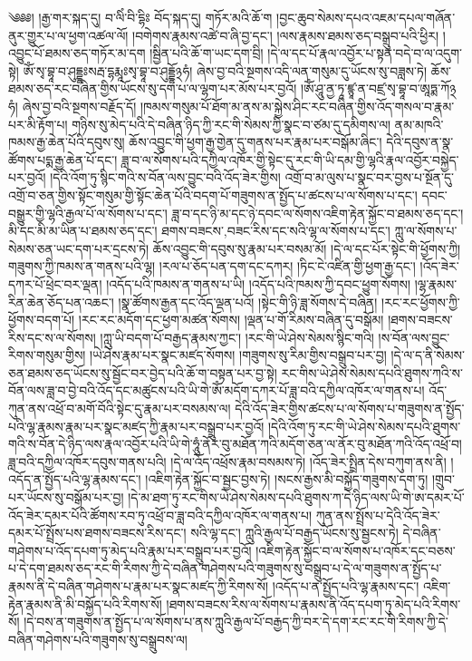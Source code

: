 \setcounter{footnote}{0} 
༄༅༅། །རྒྱ་གར་སྐད་དུ། བ་ལིཾ་བི་དྷིཿ བོད་སྐད་དུ། གཏོར་མའི་ཆོ་ག །བྱང་ཆུབ་སེམས་དཔའ་འཇམ་དཔལ་གཞོན་ནུར་གྱུར་པ་ལ་ཕྱག་འཚལ་ལོ། །བགེགས་རྣམས་འཚེ་བ་ཞི་བྱ་དང་། །ལས་རྣམས་ཐམས་ཅད་བསྒྲུབ་པའི་ཕྱིར། །འབྱུང་པོ་ཐམས་ཅད་གཏོར་མ་དག །སྦྱིན་པའི་ཆོ་ག་ཡང་དག་བྲི། །དེ་ལ་དང་པོ་རྣལ་འབྱོར་པ་སྟན་བདེ་བ་ལ་འདུག་སྟེ། ཨོཾ་སྭ་བྷཱ་བ་ཤུདྡྷཿསརྦ་དྷརྨཱཿསྭ་བྷཱ་བ་ཤུདྡྷོ྅ཧཾ། ཞེས་བྱ་བའི་སྔགས་འདི་ལན་གསུམ་དུ་ཡོངས་སུ་བཟླས་ཏེ། ཆོས་ཐམས་ཅད་རང་བཞིན་གྱིས་ཡོངས་སུ་དག་པ་ལ་ལྷག་པར་མོས་པར་བྱའོ། །ཨོཾ་ཤཱུ་ནྱ་ཏཱ་ཛྙཱ་ན་བཛྲ་སྭ་བྷཱ་བ་ཨཱཏྨ་ཀོ྅ཧཾ། ཞེས་བྱ་བའི་སྔགས་བརྗོད་དོ། །ཁམས་གསུམ་པོ་ཐོག་མ་ནས་མ་སྐྱེས་ཤིང་རང་བཞིན་གྱིས་འོད་གསལ་བ་རྣམ་པར་མི་རྟོག་པ། གཉིས་སུ་མེད་པའི་དེ་བཞིན་ཉིད་ཀྱི་རང་གི་སེམས་ཀྱི་སྣང་བ་ཙམ་དུ་དམིགས་ལ། ནམ་མཁའི་ཁམས་རྒྱ་ཆེན་པོའི་དབུས་སུ། ཆོས་འབྱུང་གི་ཕྱག་རྒྱ་གྱེན་དུ་གནས་པར་རྣམ་པར་བསྒོམ་ཞིང་། དེའི་དབུས་ན་སྣ་ཚོགས་པདྨ་རྒྱ་ཆེན་པོ་དང་། ཟླ་བ་ལ་སོགས་པའི་དཀྱིལ་འཁོར་གྱི་སྟེང་དུ་རང་གི་ཡི་དམ་གྱི་ལྷའི་རྣལ་འབྱོར་བསྐྱེད་པར་བྱའོ། །དེའི་འོག་ཏུ་སྙིང་གའི་ས་བོན་ལས་བྱུང་བའི་འོད་ཟེར་གྱིས། འགྲོ་བ་མ་ལུས་པ་སྣང་བར་བྱས་པ་སྔོན་དུ་འགྲོ་བ་ཅན་གྱིས་སྟོང་གསུམ་གྱི་སྟོང་ཆེན་པོའི་བདག་པོ་གཟུགས་ན་སྤྱོད་པ་ཚངས་པ་ལ་སོགས་པ་དང་། དབང་བསྒྱུར་གྱི་ལྷའི་རྒྱལ་པོ་ལ་སོགས་པ་དང་། ཟླ་བ་དང་ཉི་མ་དང་ཉེ་དབང་ལ་སོགས་འཇིག་རྟེན་སྐྱོང་བ་ཐམས་ཅད་དང་། མི་དང་མི་མ་ཡིན་པ་ཐམས་ཅད་དང་། ཐགས་{བཟངས་,བཟང་}རིས་དང་སའི་ལྷ་ལ་སོགས་པ་དང་། ཀླུ་ལ་སོགས་པ་སེམས་ཅན་ཡང་དག་པར་དྲངས་ཏེ། ཆོས་འབྱུང་གི་དབུས་སུ་རྣམ་པར་བསམ་མོ། །དེ་ལ་དང་པོར་སྟེང་གི་ཕྱོགས་ཀྱི། གཟུགས་ཀྱི་ཁམས་ན་གནས་པའི་ལྷ། །རལ་པ་ཅོད་པན་དག་དང་དཀར། །ཏིང་ངེ་འཛིན་གྱི་ཕྱག་རྒྱ་དང་། །འོད་ཟེར་དཀར་པོ་ཕྲེང་བར་ལྡན། །འདོད་པའི་ཁམས་ན་གནས་པ་ཡི། །འདོད་པའི་ཁམས་ཀྱི་དབང་ཕྱུག་སོགས། །ལྷ་རྣམས་རིན་ཆེན་ཅོད་པན་འཆང་། །སྣ་ཚོགས་རྒྱན་དང་འོད་ལྡན་པའོ། །སྟེང་གི་ཉི་ཟླ་སོགས་དེ་བཞིན། །རང་རང་ཕྱོགས་ཀྱི་ཕྱོགས་བདག་པོ། །རང་རང་མདོག་དང་ཕྱག་མཚན་སོགས། །ལྡན་པ་གོ་རིམས་བཞིན་དུ་བསྒོམ། །ཐགས་བཟངས་རིས་དང་ས་ལ་སོགས། །ཀླུ་ཡི་བདག་པོ་བརྒྱད་རྣམས་ཀྱང་། །རང་གི་ཡེ་ཤེས་སེམས་སྙིང་གའི། །ས་བོན་ལས་བྱུང་རིགས་གསུམ་གྱིས། །ཡེ་ཤེས་རྣམ་པར་སྣང་མཛད་སོགས། །གཟུགས་སུ་རིམ་གྱིས་བསྒྲུབ་པར་བྱ། །དེ་ལ་ད་ནི་སེམས་ཅན་ཐམས་ཅད་ཡོངས་སུ་སྦྱོང་བར་བྱེད་པའི་ཆོ་ག་བསྟན་པར་བྱ་སྟེ། རང་གིས་ཡེ་ཤེས་སེམས་དཔའི་ཐུགས་ཀའི་ས་བོན་ལས་ཟླ་བ་བྱེ་བའི་འོད་དང་མཚུངས་པའི་ཡི་གེ་ཨོཾ་མདོག་དཀར་པོ་ཟླ་བའི་དཀྱིལ་འཁོར་ལ་གནས་པ། འོད་ཀུན་ནས་འཕྲོ་བ་མགོ་བོའི་སྟེང་དུ་རྣམ་པར་བསམས་ལ། དེའི་འོད་ཟེར་གྱིས་ཚངས་པ་ལ་སོགས་པ་གཟུགས་ན་སྤྱོད་པའི་ལྷ་རྣམས་རྣམ་པར་སྣང་མཛད་ཀྱི་རྣམ་པར་བསྒྲུབ་པར་བྱའོ། །དེའི་འོག་ཏུ་རང་གི་ཡེ་ཤེས་སེམས་དཔའི་ཐུགས་གའི་ས་བོན་དེ་ཉིད་ལས་རྣལ་འབྱོར་པའི་ཡི་གེ་ཧཱུཾ་ནོར་བུ་མཐོན་ཀའི་མདོག་ཅན་ལ་ནོར་བུ་མཐོན་ཀའི་འོད་འཕྲོ་བ། ཟླ་བའི་དཀྱིལ་འཁོར་དབུས་གནས་པའི། །དེ་ལ་འོད་འཕྲོས་རྣམ་བསམས་ཏེ། །འོད་ཟེར་སྤྲིན་དེས་བཀུག་ནས་ནི། །འདོད་ན་སྤྱོད་པའི་ལྷ་རྣམས་དང་། །འཇིག་རྟེན་སྐྱོང་བ་སྦྱང་བྱས་ཏེ། །སངས་རྒྱས་མི་བསྐྱོད་གཟུགས་དག་ཏུ། །གྲུབ་པར་ཡོངས་སུ་བསྒོམ་པར་བྱ། །དེ་མ་ཐག་ཏུ་རང་གིས་ཡེ་ཤེས་སེམས་དཔའི་ཐུགས་ཀ་དེ་ཉིད་ལས་ཡི་གེ་ཨ་དམར་པོ་འོད་ཟེར་དམར་པོའི་ཚོགས་རབ་ཏུ་འཕྲོ་བ་ཟླ་བའི་དཀྱིལ་འཁོར་ལ་གནས་པ། ཀུན་ནས་སྤྲོས་པ་དེའི་འོད་ཟེར་དམར་པོ་སྤྲོས་པས་ཐགས་བཟངས་རིས་དང་། སའི་ལྷ་དང་། ཀླུའི་རྒྱལ་པོ་བརྒྱད་ཡོངས་སུ་སྦྱངས་ཏེ། དེ་བཞིན་གཤེགས་པ་འོད་དཔག་ཏུ་མེད་པའི་རྣམ་པར་བསྒྲུབ་པར་བྱའོ། །འཇིག་རྟེན་སྐྱོང་བ་ལ་སོགས་པ་འཁོར་དང་བཅས་པ་དེ་དག་ཐམས་ཅད་རང་གི་རིགས་ཀྱི་དེ་བཞིན་གཤེགས་པའི་གཟུགས་སུ་བསྒྲུབ་པ་དེ་ལ་གཟུགས་ན་སྤྱོད་པ་རྣམས་ནི་དེ་བཞིན་གཤེགས་པ་རྣམ་པར་སྣང་མཛད་ཀྱི་རིགས་སོ། །འདོད་པ་ན་སྤྱོད་པའི་ལྷ་རྣམས་དང་། འཇིག་རྟེན་རྣམས་ནི་མི་བསྐྱོད་པའི་རིགས་སོ། །ཐགས་བཟངས་རིས་ལ་སོགས་པ་རྣམས་ནི་འོད་དཔག་ཏུ་མེད་པའི་རིགས་སོ། །དེ་བས་ན་གཟུགས་ན་སྤྱོད་པ་ལ་སོགས་པ་ནས་ཀླུའི་རྒྱལ་པོ་བརྒྱད་ཀྱི་བར་དེ་དག་རང་རང་གི་རིགས་ཀྱི་དེ་བཞིན་གཤེགས་པའི་གཟུགས་སུ་བསྒྲུབས་ལ། 